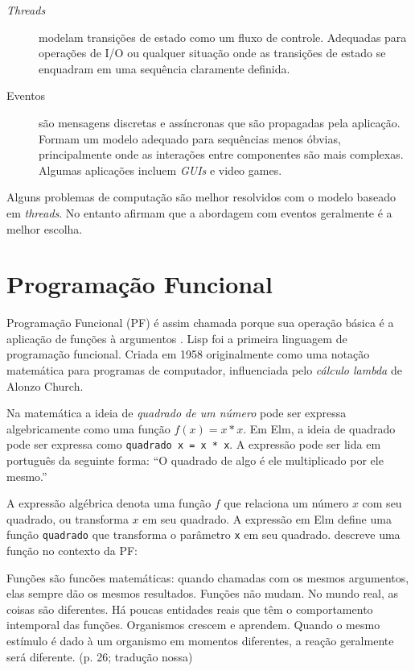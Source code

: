 \begin{description}
\item[{\emph{Threads}}] modelam transições de estado como um fluxo de controle.
Adequadas para operações de I/O ou qualquer situação onde as
transições de estado se enquadram em uma sequência claramente
definida.
\item[{Eventos}] são mensagens discretas e assíncronas que são propagadas pela
aplicação. Formam um modelo adequado para sequências menos
óbvias, principalmente onde as interações entre componentes são
mais complexas. Algumas aplicações incluem \emph{GUIs} e video
games.
\end{description}

Alguns problemas de computação são melhor resolvidos com o modelo baseado
em \emph{threads}. No entanto \textcite{blackheath2016} afirmam que a
abordagem com eventos geralmente é a melhor escolha.

\section{Programação Funcional}
\label{sec:org17a51a0}
Programação Funcional (PF) é assim chamada porque sua operação básica é a
aplicação de funções à argumentos \cite{hughes1990}.
Lisp foi a primeira linguagem de programação funcional.
Criada em 1958 originalmente como uma notação matemática para programas de
computador, influenciada pelo \emph{cálculo lambda} de Alonzo Church.

Na matemática a ideia de \emph{quadrado de um número} pode ser expressa
algebricamente como uma função \(f(x)=x*x\).
Em Elm,  a ideia de quadrado pode ser
expressa como \texttt{quadrado x = x * x}.
A expressão pode ser lida em português da seguinte forma: “O quadrado de algo
é ele multiplicado por ele mesmo.”

A expressão algébrica denota uma função \(f\) que relaciona um número \(x\) com
seu quadrado, ou transforma \(x\) em seu quadrado.
A expressão em Elm define uma função \texttt{quadrado} que transforma o
parâmetro \texttt{x} em seu quadrado.
\textcite{roy2009} descreve uma função no contexto da PF:

\begin{citacao}
  Funções são funcões matemáticas: quando chamadas com os mesmos argumentos,
  elas sempre dão os mesmos resultados. Funções não mudam. No mundo real,
  as coisas são diferentes. Há poucas entidades reais que têm o comportamento
  intemporal das funções. Organismos crescem e aprendem. Quando o mesmo
  estímulo é dado à um organismo em momentos diferentes, a reação geralmente
  será diferente. (p. 26; tradução nossa)
\end{citacao}

